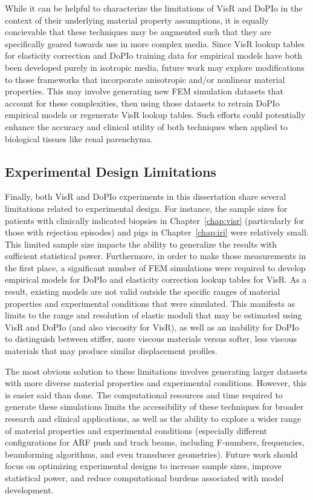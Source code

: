 While it can be helpful to characterize the limitations of VisR and DoPIo in the context of their underlying material property assumptions, it is equally concievable that these techniques may be augmented such that they are specifically geared towards use in more complex media. Since VisR lookup tables for elasticity correction and DoPIo training data for empirical models have both been developed purely in isotropic media, future work may explore modifications to those frameworks that incorporate anisotropic and/or nonlinear material properties. This may involve generating new FEM simulation datasets that account for these complexities, then using those datasets to retrain DoPIo empirical models or regenerate VisR lookup tables. Such efforts could potentially enhance the accuracy and clinical utility of both techniques when applied to biological tissues like renal parenchyma.

\subsection{Experimental Design Limitations}

Finally, both VisR and DoPIo experiments in this dissertation share several limitations related to experimental design. For instance, the sample sizes for patients with clinically indicated biopsies in Chapter~\ref{chap:visr} (particularly for those with rejection episodes) and pigs in Chapter~\ref{chap:iri} were relatively small. This limited sample size impacts the ability to generalize the results with sufficient statistical power. Furthermore, in order to make those measurements in the first place, a significant number of FEM simulations were required to develop empirical models for DoPIo and elasticity correction lookup tables for VisR. As a result, existing models are not valid outside the specific ranges of material properties and experimental conditions that were simulated. This manifests as limits to the range and resolution of elastic moduli that may be estimated using VisR and DoPIo (and also viscosity for VisR), as well as an inability for DoPIo to distinguish between stiffer, more viscous materials versus softer, less viscous materials that may produce similar displacement profiles.

The most obvious solution to these limitations involves generating larger datasets with more diverse material properties and experimental conditions. However, this is easier said than done. The computational resources and time required to generate these simulations limits the accessibility of these techniques for broader research and clinical applications, as well as the ability to explore a wider range of material properties and experimental conditions (especially different configurations for ARF push and track beams, including F-numbers, frequencies, beamforming algorithms, and even transducer geometries). Future work should focus on optimizing experimental designs to increase sample sizes, improve statistical power, and reduce computational burdens associated with model development.

